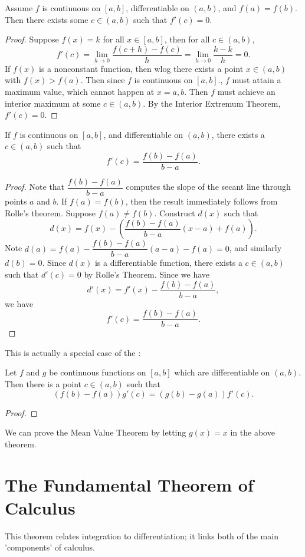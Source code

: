 \begin{theorem}
Assume $f$ is continuous on $[a,b]$, differentiable on $(a,b)$, and $f(a) = f(b)$. Then there exists some $c \in (a,b)$ such that $f'(c) = 0$. 
\end{theorem}
\begin{proof}
Suppose $f(x) = k$ for all $x \in [a,b]$, then for all $c \in (a,b)$, 
\[ f'(c) = \lim_{h\to 0} \dfrac{f(c + h) - f(c)}{h} = \lim_{h\to 0} \dfrac{k-k}{h} = 0. \] 
If $f(x)$ is a nonconstant function, then wlog there exists a point $x \in (a,b)$ with $f(x) > f(a)$. Then since $f$ is continuous on $[a,b]$., $f$ must attain a maximum value, which cannot happen at $x = a,b$. Then $f$ must achieve an interior maximum at some $c \in (a,b)$. By the Interior Extremum Theorem, $f'(c) = 0$. 
\end{proof}
\newpage
\begin{theorem}
If $f$ is continuous on $[a,b]$, and differentiable on $(a,b)$, there exists a $c \in (a,b)$ such that 
\[ f'(c) = \dfrac{f(b) - f(a)}{b-a}. \]
\end{theorem}
\begin{proof}
Note that $\dfrac{f(b) - f(a)}{b-a}$ computes the slope of the secant line through points $a$ and $b$. If $f(a) = f(b)$, then the result immediately follows from Rolle's theorem. Suppose $f(a) \neq f(b)$. Construct $d(x)$ such that 
\[ d(x) = f(x) - \left (\dfrac{f(b) - f(a)}{b - a}(x-a) + f(a) \right). \]
Note $d(a) = f(a) - \dfrac{f(b) - f(a)}{b - a}(a-a) - f(a) = 0$, and similarly $d(b) = 0$. Since $d(x)$ is a differentiable function, there exists a $c \in (a,b)$ such that $d'(c) = 0$ by Rolle's Theorem. Since we have 
\[ d'(x) = f'(x) - \dfrac{f(b) - f(a)}{b - a}, \] we have \[ f'(c) = \dfrac{f(b) - f(a)}{b - a}. \]
\end{proof}
This is actually a special case of the : 
\begin{theorem}
Let $f$ and $g$ be continuous functions on $[a,b]$ which are differentiable on $(a,b)$. Then there is a point $c \in (a,b)$ such that 
\[ (f(b) - f(a))g'(c) = (g(b) - g(a))f'(c). \] 
\end{theorem}
\begin{proof}

\end{proof}
We can prove the Mean Value Theorem by letting $g(x) = x$ in the above theorem. 
\section{The Fundamental Theorem of Calculus}
This theorem relates integration to differentiation; it links both of the main 'components' of calculus.

